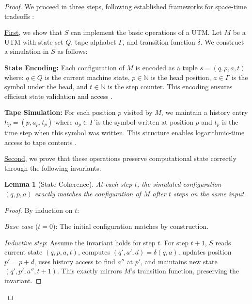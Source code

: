 \documentclass[12pt]{article}
\newtheorem{lemma}[theorem]{Lemma}
\begin{document}
\begin{proof}
We proceed in three steps, following established frameworks for space-time tradeoffs \cite{swamy1983space,hu2014computational}:

\vspace{0.5em}
\noindent\underline{First}, we show that $S$ can implement the basic operations of a UTM. Let $M$ be a UTM with state set $Q$, tape alphabet $\Gamma$, and transition function $\delta$. We construct a simulation in $S$ as follows:

\vspace{0.5em}
\noindent\textbf{State Encoding:} Each configuration of $M$ is encoded as a tuple $s = (q, p, a, t)$ where: $q \in Q$ is the current machine state, $p \in \mathbb{N}$ is the head position, $a \in \Gamma$ is the symbol under the head, and $t \in \mathbb{N}$ is the step counter.
This encoding ensures efficient state validation and access \cite{boyle2024memory,hu2014computational}.

\vspace{0.5em}
\noindent\textbf{Tape Simulation:} For each position $p$ visited by $M$, we maintain a history entry $h_p = (p, a_p, t_p)$ where $a_p \in \Gamma$ is the symbol written at position $p$ and $t_p$ is the time step when this symbol was written.
This structure enables logarithmic-time access to tape contents \cite{swamy1983space,liskiewicz1994complexity}.

\vspace{0.5em}
\noindent\underline{Second}, we prove that these operations preserve computational state correctly through the following invariants:

\begin{lemma}[State Coherence]
At each step $t$, the simulated configuration $(q, p, a)$ exactly matches the configuration of $M$ after $t$ steps on the same input.
\end{lemma}

\begin{proof}
By induction on $t$:

\vspace{0.3em}
\noindent\textit{Base case} ($t=0$): The initial configuration matches by construction.

\vspace{0.3em}
\noindent\textit{Inductive step}: Assume the invariant holds for step $t$. 
For step $t+1$, $S$ reads current state $(q, p, a, t)$, computes $(q', a', d) = \delta(q, a)$, updates position $p' = p + d$, uses history access to find $a''$ at $p'$, and maintains new state $(q', p', a'', t+1)$.
This exactly mirrors $M$'s transition function, preserving the invariant.
\end{proof}


\end{proof}
\end{document}
